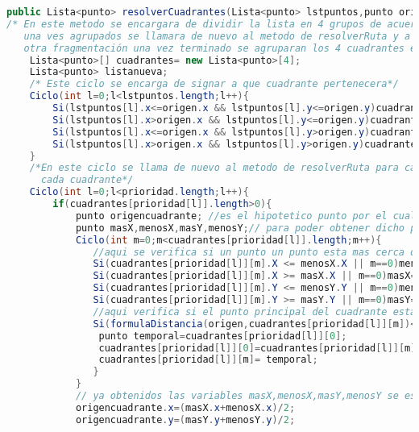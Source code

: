 \begin{lstlisting}[language=JAVA, caption=Pseudocodigo del Rectangulo aureo, label=lst:codigo10]
public Lista<punto> resolverCuadrantes(Lista<punto> lstpuntos,punto origen;int[] prioridad)){
/* En este metodo se encargara de dividir la lista en 4 grupos de acuerdo a la relación con los ejes X,Y del punto origen, 
   una ves agrupados se llamara de nuevo al metodo de resolverRuta y a su ves llamara de nuevo este método en caso de necesitar 
   otra fragmentación una vez terminado se agruparan los 4 cuadrantes en uno solo y se iran integrando*/
	Lista<punto>[] cuadrantes= new Lista<punto>[4];
	Lista<punto> listanueva;
	/* Este ciclo se encarga de signar a que cuadrante pertenecera*/
	Ciclo(int l=0;l<lstpuntos.length;l++){
		Si(lstpuntos[l].x<=origen.x && lstpuntos[l].y<=origen.y)cuadrantes[0].agregar(lstpuntos[l]);
		Si(lstpuntos[l].x>origen.x && lstpuntos[l].y<=origen.y)cuadrantes[1].agregar(lstpuntos[l]);
		Si(lstpuntos[l].x<=origen.x && lstpuntos[l].y>origen.y)cuadrantes[2].agregar(lstpuntos[l]);;
		Si(lstpuntos[l].x>origen.x && lstpuntos[l].y>origen.y)cuadrantes[3].agregar(lstpuntos[l]);;
	}
	/*En este ciclo se llama de nuevo al metodo de resolverRuta para cada uno de los 4 grupos, dentro de ahi se creara un punto medio para el origen de 
	  cada cuadrante*/
	Ciclo(int l=0;l<prioridad.length;l++){
		if(cuadrantes[prioridad[l]].length>0){
			punto origencuadrante; //es el hipotetico punto por el cual van a partir los demas cuadrantes en caso de que necesite refragmentarse otra ves
			punto masX,menosX,masY,menosY;// para poder obtener dicho punto se buscara que numeros estan mas y menos cerca de los ejes X y Y y asi calcular las coordenadas
			Ciclo(int m=0;m<cuadrantes[prioridad[l]].length;m++){
			   //aqui se verifica si un punto un punto esta mas cerca o lejos del eje X o Y que el anterior, si el ciclo esta empezando se pondran por default
			   Si(cuadrantes[prioridad[l]][m].X <= menosX.X || m==0)menosX=cuadrantes[prioridad[l]][m];
			   Si(cuadrantes[prioridad[l]][m].X >= masX.X || m==0)masX=cuadrantes[prioridad[l]][m];
			   Si(cuadrantes[prioridad[l]][m].Y <= menosY.Y || m==0)menosY=cuadrantes[prioridad[l]][m];
			   Si(cuadrantes[prioridad[l]][m].Y >= masY.Y || m==0)masY=cuadrantes[prioridad[l]][m];
			   //aqui verifica si el punto principal del cuadrante esta mas cerca del origen, en caso que haya otro mas cerca se cambiaran de lugares
			   Si(formulaDistancia(origen,cuadrantes[prioridad[l]][m])<formulaDistancia(origen,cuadrantes[prioridad[l]][0])){
				punto temporal=cuadrantes[prioridad[l]][0];
				cuadrantes[prioridad[l]][0]=cuadrantes[prioridad[l]][m];
				cuadrantes[prioridad[l]][m]= temporal;
			   }
			}
			// ya obtenidos las variables masX,menosX,masY,menosY se establece las coordenadas del origen
			origencuadrante.x=(masX.x+menosX.x)/2;
			origencuadrante.y=(masY.y+menosY.y)/2;
			

\end{lstlisting}
